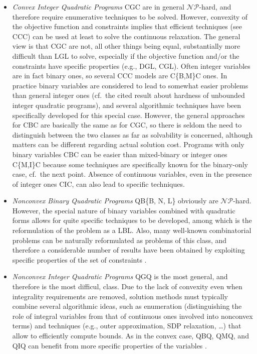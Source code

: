 \begin{itemize}
 \item \emph{Convex Integer Quadratic Programs} CGC are in general $\mathcal{NP}$-hard, and therefore require enumerative techniques to be solved. However, convexity of the objective function and constraints implies that efficient techniques (see CCC) can be used at least to solve the continuous relaxation. The general view is that CGC are not, all other things being equal,  substantially more difficult than LGL to solve, especially if the objective function and/or the constraints have specific properties (e.g., DGL, CGL). Often integer variables are in fact binary ones, so several CCC models are C\{B,M\}C ones. In practice binary variables are considered to lead to somewhat easier problems than general integer ones (cf.~the cited result about hardness of unbounded integer quadratic programs), and several algorithmic techniques have been specifically developed for this special case. However, the general approaches for CBC are basically the same as for CGC, so there is seldom the need to distinguish between the two classes as far as solvability is concerned, although matters can be different regarding actual solution cost. Programs with only binary variables CBC can be easier than mixed-binary or integer ones C\{M,I\}C because some techniques are specifically known for the binary-only case, cf.~the next point. Absence of continuous variables, even in the presence of integer ones CIC, can also lead to specific techniques.
  \item \emph{Nonconvex Binary Quadratic Programs} QB\{B, N, L\} obviously are $\mathcal{NP}$-hard. However, the special nature of binary variables combined with quadratic forms allows for quite specific techniques to be developed, among which is the reformulation of the problem as a LBL. Also, many well-known combinatorial problems can be naturally reformulated as problems of this class, and therefore a considerable number of results have been obtained by exploiting specific properties of the set of constraints \cite{Rendl2008}.
  \item \emph{Nonconvex Integer Quadratic Programs} QGQ is the most general, and therefore is the most difficul, class. Due to the lack of convexity even when integrality requirements are removed, solution methods must typically combine several algorithmic ideas, such as enumeration (distinguishing the role of integral variables from that of continuous ones involved into nonconvex terms) and techniques (e.g., outer approximation, SDP relaxation, \ldots) that allow to efficiently compute bounds. As in the convex case, QBQ, QMQ, and QIQ can benefit from more specific properties of the variables \cite{Buchheim2013,Dong2016}.
\end{itemize}
